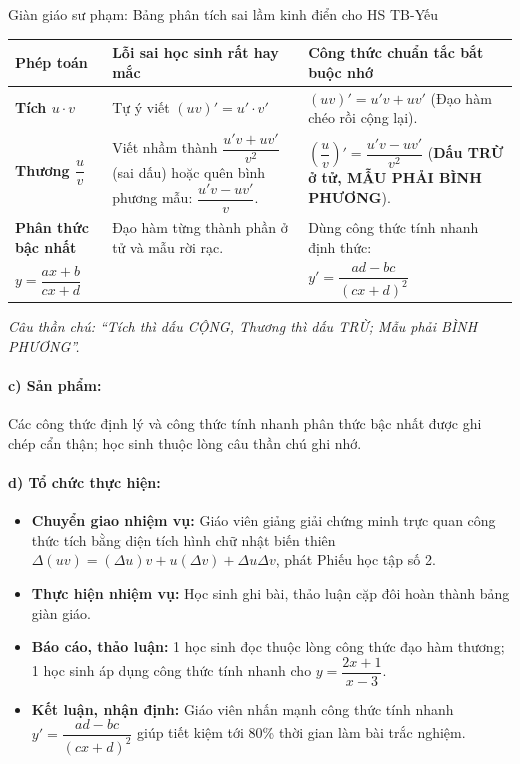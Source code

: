 \documentclass[12pt, a4paper]{article}
\begin{document}
\begin{scaffoldbox}{Giàn giáo sư phạm: Bảng phân tích sai lầm kinh điển cho HS TB-Yếu}
\begin{center}
\small
\begin{tabularx}{\linewidth}{|l|X|X|}
\hline
\textbf{Phép toán} & \textbf{Lỗi sai học sinh rất hay mắc} & \textbf{Công thức chuẩn tắc bắt buộc nhớ} \\ \hline
\textbf{Tích $u \cdot v$} & Tự ý viết $(uv)' = u' \cdot v'$ & $(uv)' = u'v + uv'$ (Đạo hàm chéo rồi cộng lại). \\ \hline
\textbf{Thương $\dfrac{u}{v}$} & Viết nhầm thành $\dfrac{u'v + uv'}{v^2}$ (sai dấu) hoặc quên bình phương mẫu: $\dfrac{u'v - uv'}{v}$. & $\left(\dfrac{u}{v}\right)' = \dfrac{u'v - uv'}{v^2}$ (\textbf{Dấu TRỪ ở tử, MẪU PHẢI BÌNH PHƯƠNG}). \\ \hline
\textbf{Phân thức bậc nhất} & Đạo hàm từng thành phần ở tử và mẫu rời rạc. & Dùng công thức tính nhanh định thức: \\ 
$y = \dfrac{ax + b}{cx + d}$ & & $y' = \dfrac{ad - bc}{(cx + d)^2}$ \\ \hline
\end{tabularx}
\end{center}
\textit{Câu thần chú: ``Tích thì dấu CỘNG, Thương thì dấu TRỪ; Mẫu phải BÌNH PHƯƠNG''.}
\end{scaffoldbox}

\paragraph{c) Sản phẩm:} Các công thức định lý và công thức tính nhanh phân thức bậc nhất được ghi chép cẩn thận; học sinh thuộc lòng câu thần chú ghi nhớ.

\paragraph{d) Tổ chức thực hiện:}
\begin{itemize}[leftmargin=0.8cm]
    \item \textbf{Chuyển giao nhiệm vụ:} Giáo viên giảng giải chứng minh trực quan công thức tích bằng diện tích hình chữ nhật biến thiên $\Delta(uv) = (\Delta u) v + u (\Delta v) + \Delta u \Delta v$, phát Phiếu học tập số 2.
    \item \textbf{Thực hiện nhiệm vụ:} Học sinh ghi bài, thảo luận cặp đôi hoàn thành bảng giàn giáo.
    \item \textbf{Báo cáo, thảo luận:} 1 học sinh đọc thuộc lòng công thức đạo hàm thương; 1 học sinh áp dụng công thức tính nhanh cho $y = \dfrac{2x + 1}{x - 3}$.
    \item \textbf{Kết luận, nhận định:} Giáo viên nhấn mạnh công thức tính nhanh $y' = \dfrac{ad - bc}{(cx+d)^2}$ giúp tiết kiệm tới 80\% thời gian làm bài trắc nghiệm.
\end{itemize}
\end{document}
